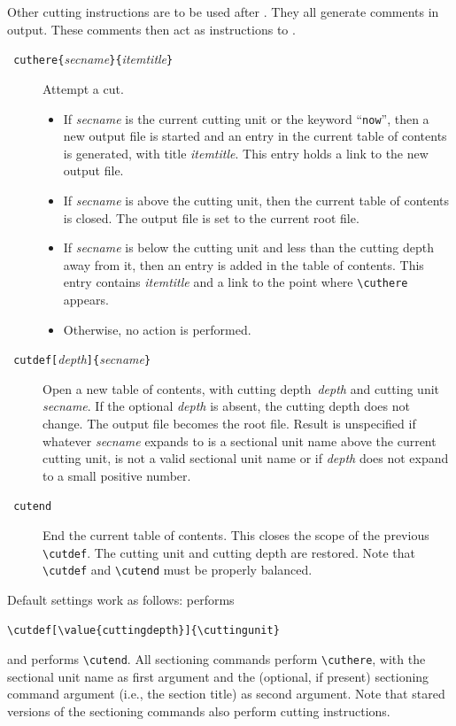 Other cutting instructions are to be used after
\verb++. They all generate \html{} comments in \hevea{}
output.
These comments then act as instructions to {\hacha}.
\begin{description}
\item[{\tt{} cuthere\{}{\it secname}{\tt\}\{}{\it itemtitle}{\tt\}}]
   Attempt a cut.
   \begin{itemize}
   \item If {\it secname} is the current cutting  unit or
   the keyword ``\texttt{now}'', then
   a new output file is started and an entry in the current table of contents
   is generated, with title {\it itemtitle}. This entry holds a link
   to the new output file.
   \item If {\it secname} is above the cutting  unit, then the
   current table of contents is closed. The output file is set to the
   current root file.
   \item If {\it secname} is below the cutting  unit and less than the
   cutting depth away from it, then an entry is added in the table of
   contents.
   This entry contains {\em itemtitle} and a link to the point where
   \verb+\cuthere+ appears.
   \item Otherwise, no action is performed.
   \end{itemize}

\item[{\tt{} cutdef[}{\it depth}{\tt]\{}{\it secname}{\tt \}}]
   Open a new table of contents, with cutting depth~{\em depth} and
   cutting unit {\em secname}. If the optional {\em depth} is absent,
   the cutting depth does not change.
   The output file becomes the root file.
   Result is unspecified if whatever {\em secname} expands to is
   a sectional unit name above
   the current cutting  unit, is not a valid sectional unit name or if
   {\em depth} does not expand to a small positive number.
\item[{\tt{} cutend}]
   End the current table of contents. This closes the scope of the
   previous \verb+\cutdef+. The cutting unit and cutting depth are
   restored.
   Note that \verb+\cutdef+ and \verb+\cutend+ must be properly balanced.
\end{description}

\noindent Default settings work as follows:
\verb++ performs
\begin{verbatim}
\cutdef[\value{cuttingdepth}]{\cuttingunit}
\end{verbatim}
and \verb++
performs \verb+\cutend+.
All sectioning commands perform \verb+\cuthere+,
with the sectional unit name as first argument and the (optional, if
present) sectioning
command argument (i.e., the section title) as second argument.
Note that stared versions of the sectioning commands also perform
cutting instructions.

